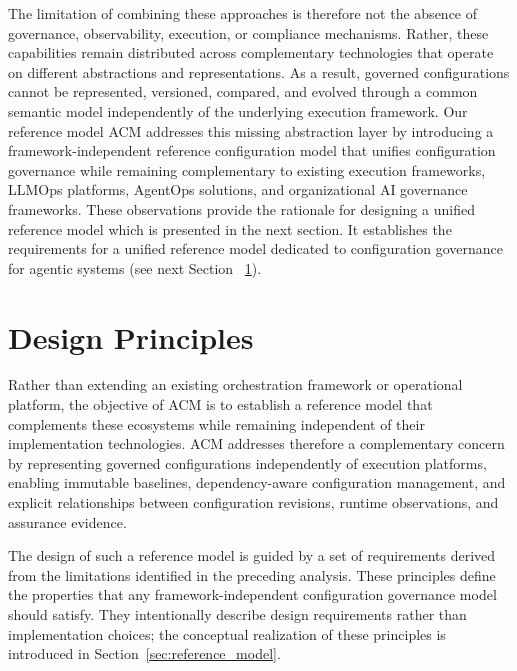 \documentclass[10pt]{article}
\begin{document}
The limitation of combining these approaches is therefore not the absence of governance, observability, execution, or compliance mechanisms. Rather, these capabilities remain distributed across complementary technologies that operate on different abstractions and representations. As a result, governed configurations cannot be represented, versioned, compared, and evolved through a common semantic model independently of the underlying execution framework. Our reference model ACM addresses this missing abstraction layer by introducing a framework-independent reference configuration model that unifies configuration governance while remaining complementary to existing execution frameworks, LLMOps platforms, AgentOps solutions, and organizational AI governance frameworks. These observations provide the rationale for designing a unified reference model which is presented in the next section. It establishes the requirements for a unified reference model dedicated to configuration governance for agentic systems (see next Section ~\ref{sec:design_principles}).

\section{Design Principles}
\label{sec:design_principles}

Rather than extending an existing orchestration framework or operational platform, the objective of ACM is to establish a reference model that complements these ecosystems while remaining independent of their implementation technologies. ACM addresses therefore a complementary concern by representing governed configurations independently of execution platforms, enabling immutable baselines, dependency-aware configuration management, and explicit relationships between configuration revisions, runtime observations, and assurance evidence.

The design of such a reference model is guided by a set of requirements derived from the limitations identified in the preceding analysis. These principles define the properties that any framework-independent configuration governance model should satisfy. They intentionally describe design requirements rather than implementation choices; the conceptual realization of these principles is introduced in Section~\ref{sec:reference_model}.
\end{document}
